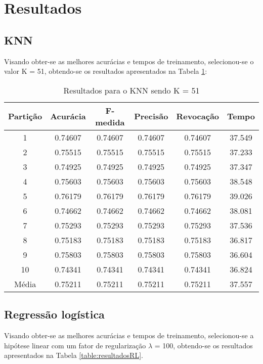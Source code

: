 \section{Resultados}

\subsection{KNN}

Visando obter-se as melhores acurácias e tempos de treinamento, selecionou-se o valor K = 51, obtendo-se os resultados apresentados na Tabela \ref{table:resultadosKNN}:

\begin{table}[h]
\centering
\caption{Resultados para o KNN sendo K = 51}
\vspace{0.2cm}
\begin{tabular}{c|c|c|c|c|c}
Partição & Acurácia & F-medida & Precisão & Revocação & Tempo \\
\hline
1  & 0.74607 & 0.74607 & 0.74607 & 0.74607 & 37.549 \\
2  & 0.75515 & 0.75515 & 0.75515 & 0.75515 & 37.233 \\
3  & 0.74925 & 0.74925 & 0.74925 & 0.74925 & 37.347 \\
4  & 0.75603 & 0.75603 & 0.75603 & 0.75603 & 38.548 \\
5  & 0.76179 & 0.76179 & 0.76179 & 0.76179 & 39.026 \\
6  & 0.74662 & 0.74662 & 0.74662 & 0.74662 & 38.081 \\
7  & 0.75293 & 0.75293 & 0.75293 & 0.75293 & 37.536 \\
8  & 0.75183 & 0.75183 & 0.75183 & 0.75183 & 36.817 \\
9  & 0.75803 & 0.75803 & 0.75803 & 0.75803 & 36.604 \\
10 & 0.74341 & 0.74341 & 0.74341 & 0.74341 & 36.824 \\
\hline
Média & 0.75211 & 0.75211 & 0.75211 & 0.75211 & 37.557

\end{tabular} 
\label{table:resultadosKNN}
\end{table}

\subsection{Regressão logística}

Visando obter-se as melhores acurácias e tempos de treinamento, selecionou-se a hipótese linear com um fator de regularização \(\lambda\) = 100, obtendo-se os resultados apresentados na Tabela \ref{table:resultadosRL}.

